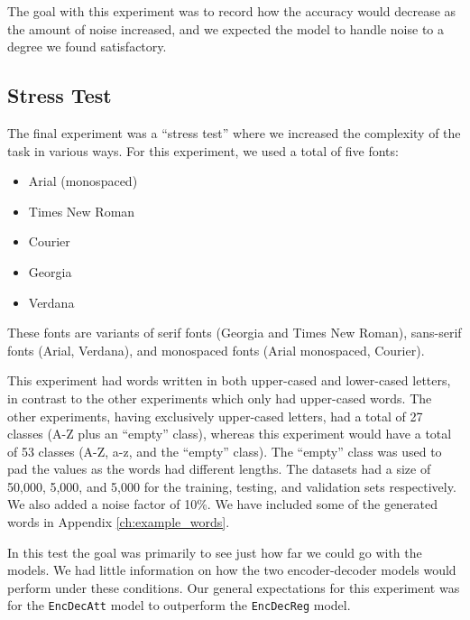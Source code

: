 The goal with this experiment was to record how the accuracy would decrease as the amount of noise increased, and we expected the model to handle noise to a degree we found satisfactory.

\subsection{Stress Test}
The final experiment was a ``stress test'' where we increased the complexity of the task in various ways. For this experiment, we used a total of five fonts:

\begin{itemize}
    \item Arial (monospaced)
    \item Times New Roman
    \item Courier
    \item Georgia
    \item Verdana
\end{itemize}

These fonts are variants of serif fonts (Georgia and Times New Roman), sans-serif fonts (Arial, Verdana), and monospaced fonts (Arial monospaced, Courier).

This experiment had words written in both upper-cased and lower-cased letters, in contrast to the other experiments which only had upper-cased words. The other experiments, having exclusively upper-cased letters, had a total of 27 classes (A-Z plus an ``empty'' class), whereas this experiment would have a total of 53 classes (A-Z, a-z, and the ``empty'' class). The ``empty'' class was used to pad the values as the words had different lengths. The datasets had a size of 50,000, 5,000, and 5,000 for the training, testing, and validation sets respectively. We also added a noise factor of 10\%. We have included some of the generated words in Appendix \ref{ch:example_words}.

In this test the goal was primarily to see just how far we could go with the models. We had little information on how the two encoder-decoder models would perform under these conditions. Our general expectations for this experiment was for the {\tt EncDecAtt} model to outperform the {\tt EncDecReg} model.